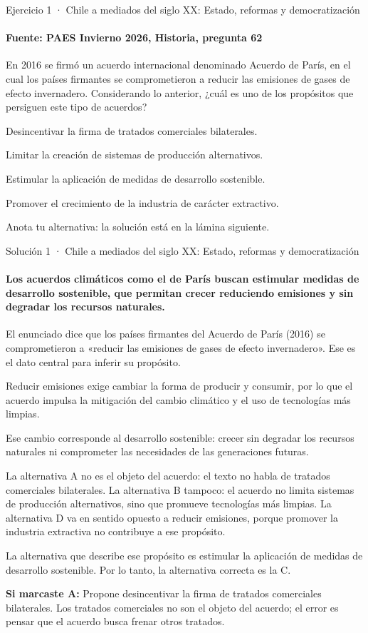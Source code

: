 \documentclass[aspectratio=169,11pt]{beamer}
\newcommand{\alternativa}[2]{\begin{opcion}\tecla{#1}\hspace{0.6em}#2\end{opcion}}
\newcommand{\paso}[2]{\par\noindent\makebox[1.4em][l]{\color{zinc500}\ttfamily\small #1}\parbox[t]{\dimexpr\linewidth-1.4em}{#2}\par\vspace{0.45em}}
\newcommand{\respuesta}[2]{\par\vspace{0.3em}\noindent\teclaok{#1}\hspace{0.5em}{\small\bfseries respuesta oficial}\hspace{0.5em}{\scriptsize\color{zinc500}#2}\par}
\newlength{\ajustealto}
\newenvironment{ajustar}[1][0.74\textheight]
  {\setlength{\ajustealto}{#1}\begin{lrbox}{\ajustecaja}\begin{minipage}{\textwidth}}
  {\end{minipage}\end{lrbox}%
   \ifdim\dimexpr\ht\ajustecaja+\dp\ajustecaja\relax>\ajustealto
     \resizebox*{!}{\ajustealto}{\usebox{\ajustecaja}}\else\usebox{\ajustecaja}\fi}
\begin{document}
\begin{frame}{Ejercicio 1 · Chile a mediados del siglo XX: Estado, reformas y democratización}
\framesubtitle{Fuente: PAES Invierno 2026, Historia, pregunta 62}
\begin{ajustar}[0.7\textheight]
{\small En 2016 se firmó un acuerdo internacional denominado Acuerdo de París, en el cual los países firmantes se comprometieron a reducir las emisiones de gases de efecto invernadero. Considerando lo anterior, ¿cuál es uno de los propósitos que persiguen este tipo de acuerdos?}
\vspace{0.4em}
\alternativa{A}{Desincentivar la firma de tratados comerciales bilaterales.}
\alternativa{B}{Limitar la creación de sistemas de producción alternativos.}
\alternativa{C}{Estimular la aplicación de medidas de desarrollo sostenible.}
\alternativa{D}{Promover el crecimiento de la industria de carácter extractivo.}
\end{ajustar}
\vfill{\tiny\color{zinc500}\hfill Anota tu alternativa: la solución está en la lámina siguiente.}
\end{frame}

\begin{frame}{Solución 1 · Chile a mediados del siglo XX: Estado, reformas y democratización}
\framesubtitle{Los acuerdos climáticos como el de París buscan estimular medidas de desarrollo sostenible, que permitan crecer reduciendo emisiones y sin degradar los recursos naturales.}
\begin{ajustar}[0.58\textheight]
{\footnotesize
\paso{1}{El enunciado dice que los países firmantes del Acuerdo de París (2016) se comprometieron a «reducir las emisiones de gases de efecto invernadero». Ese es el dato central para inferir su propósito.}
\paso{2}{Reducir emisiones exige cambiar la forma de producir y consumir, por lo que el acuerdo impulsa la mitigación del cambio climático y el uso de tecnologías más limpias.}
\paso{3}{Ese cambio corresponde al desarrollo sostenible: crecer sin degradar los recursos naturales ni comprometer las necesidades de las generaciones futuras.}
\paso{4}{La alternativa A no es el objeto del acuerdo: el texto no habla de tratados comerciales bilaterales. La alternativa B tampoco: el acuerdo no limita sistemas de producción alternativos, sino que promueve tecnologías más limpias. La alternativa D va en sentido opuesto a reducir emisiones, porque promover la industria extractiva no contribuye a ese propósito.}
\paso{5}{La alternativa que describe ese propósito es estimular la aplicación de medidas de desarrollo sostenible. Por lo tanto, la alternativa correcta es la C.}
}
\respuesta{C}{PAES Invierno 2026, Historia, pregunta 62}
\begin{notagris}\scriptsize \textbf{Si marcaste A:} Propone desincentivar la firma de tratados comerciales bilaterales. Los tratados comerciales no son el objeto del acuerdo; el error es pensar que el acuerdo busca frenar otros tratados.\end{notagris}
\end{ajustar}
\end{frame}
\end{document}
